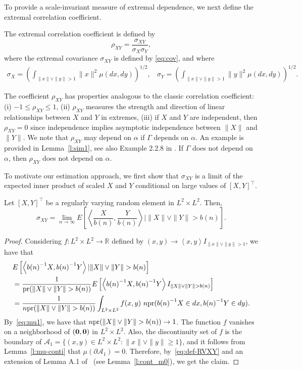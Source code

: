 \documentclass[lineno]{biometrika}
\newcommand \ag{\alpha}
\newcommand \Gg{\Gamma}
\newcommand \sg{\sigma}
\newcommand\bzero{\mbox{\boldmath${0}$}}
\newcommand\mbR{{\mathbb R}}
\newcommand\lp{\left (}
\newcommand\rp{\right )}
\newcommand\lb{\left [}
\newcommand\rb{\right ]}
\newcommand\lip{\left \langle}
\newcommand\rip{\right \rangle}
\begin{document}
To provide a scale-invariant measure of extremal dependence, we next define the extremal correlation coefficient.


\begin{definition} \label{d:cor}
The extremal correlation coefficient is defined by
\begin{equation} \label{eq:cor}
\rho_{XY} = \frac{\sg_{XY}}{\sg_{X}\sg_{Y}},
\end{equation}
where the extremal covariance $\sg_{XY}$ is defined by \eqref{eq:cov}, and
where
\begin{align*}
\sg_{X} = \lp \int_{\|x\| \vee \|y\|>1}  \|x\|^2   \mu(dx,dy) \rp^{1/2}, \ \ \ \
\sg_{Y} = \lp \int_{\|x\| \vee \|y\|>1}  \|y\|^2   \mu(dx,dy) \rp^{1/2}.
\end{align*}
\end{definition}
The coefficient $\rho_{XY}$ has  properties  analogous to the
classic correlation coefficient: (i) $-1\le \rho_{XY} \le 1$, (ii) $\rho_{XY}$
measures the strength and direction of linear relationships between $X$
and $Y$ in extremes, (iii) if $X$ and $Y$ are independent,
then $\rho_{XY}=0$ since independence implies asymptotic
independence between $\|X\|$ and $\|Y\|$. We note that
$\rho_{XY}$ may depend on $\ag$ if $\Gg$ depends on $\ag$.
An example is provided in Lemma~\ref{l:sim1}, see also Example 2.2.8 in
\citet{kulik:soulier:2020}. If $\Gg$ does not depend on
$\ag$, then $\rho_{XY}$ does not depend on $\ag$.


To motivate our estimation approach,
we first show that  $\sg_{XY}$ is a  limit of the expected inner product of scaled $X$ and $Y$ conditional on large values of $[X,Y]^{\top}$.

\begin{proposition} \label{p:sglim}
Let $[X,Y]^{\top}$ be a regularly varying random element in $L^2 \times L^2$. Then,
\[
\sg_{XY} = \lim_{n\to \infty}E\lb \lip \frac{X}{b(n)}, \frac{Y}{b(n)} \rip \Bigg|\|X\| \vee \|Y\| >b(n)\rb.
\]
\end{proposition}

\begin{proof}
Considering $f: L^2 \times L^2 \to \mbR$ defined by $(x, y) \to \lip x, y \rip I_{\|x\| \vee \|y\|>1}$, we have that
\begin{align*}
&E\lb \lip {b(n)}^{-1}X, {b(n)}^{-1}Y \rip | \|X\| \vee \|Y\| >{b(n)}\rb \\
&=\frac{1}{{\rm pr}(\|X\|\vee\|Y\|>{b(n)})} E\lb \lip {b(n)}^{-1}X, {b(n)}^{-1}Y \rip I_{\|X\| \vee \|Y\| >{b(n)}}\rb\\
&=\frac{1}{n{\rm pr}(\|X\|\vee\|Y\|>{b(n)})}\int_{L^2 \times L^2} f(x,y) \ n{\rm pr}({b(n)}^{-1}X \in dx, {b(n)}^{-1}Y \in dy).
\end{align*}
By~\eqref{eq:mu1}, we have that $n{\rm pr}(\|X\|\vee\|Y\|>{b(n)}) \to 1$.
The function $f$ vanishes on a neighborhood of
$(\bzero, \bzero)$ in $L^2 \times L^2$. Also, the discontinuity set of $f$ is the
boundary of $\mathcal A_1 = \{(x,y) \in L^2 \times L^2: \|x\| \vee \|y\| \ge 1\}$,
and it follows from Lemma~\ref{l:mu-conti}
that $\mu(\partial \mathcal A_1)=0$.
Therefore, by~\eqref{eq:def-RVXY} and an extension of Lemma A.1 
of~\citet{meinguet:segers:2010} (see Lemma~\ref{l:cont_m0}),  
we get the claim. 
\end{proof}
\end{document}
